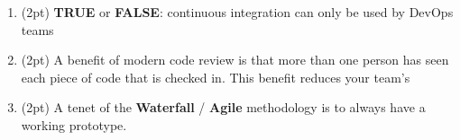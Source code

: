 \documentclass{report}
\newif\ifkey
\newcommand{\correct}[1]{\ifkey\color{red}\textbf{#1}\color{black}\else\textbf{#1}\fi\xspace}
\newcommand{\answershort}[1]{\ifkey\color{red}\underline{\textbf{#1}}\color{black}\else\underline{\hspace{3in}}\fi\xspace}
\newcommand*{\pts}[1]{\addtocounter{points}{#1}(#1pt)}
\begin{document}
\begin{spacing}{1.4}
\begin{enumerate}[leftmargin=*]

  
\item \pts{2}
  \textbf{TRUE} or \correct{FALSE}: continuous integration can only be used by DevOps teams


\item \pts{2}
  A benefit of modern code review is that more than one person has seen each piece of code that is checked in. This benefit
  reduces your team's \answershort{bus factor}

\item \pts{2}
  A tenet of the \textbf{Waterfall} / \correct{Agile} methodology is to always have a working prototype.



\end{enumerate}
\end{spacing}
\end{document}
